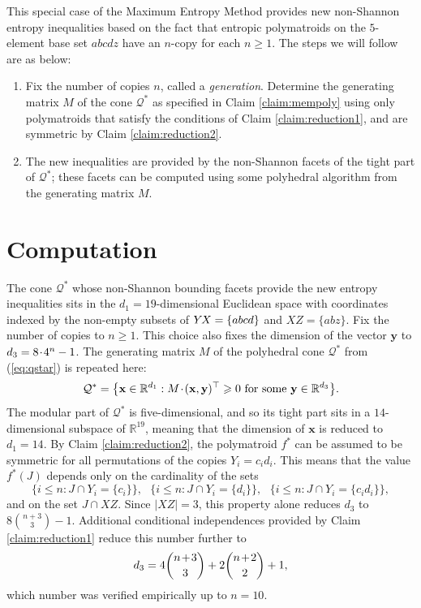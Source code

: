 \documentclass[reqno]{amsart}
\theoremstyle{definition}
\newcommand\tsp{\mkern 1.5mu}
\renewcommand\ge{\geqslant}\renewcommand\le{\leqslant}
\newcommand\R{\mathbb R}  %
\newcommand\T{\top}       %
\def\m#1{\tsp{#1}\tsp}
\def\YX{Y\mkern-2mu X}
\newcommand\blabel[1]{\hypertarget{#1}{}}
\begin{document}
This special case of the Maximum Entropy Method provides new non-Shannon
entropy inequalities based on the fact that entropic polymatroids on the
$5$-element base set $abcdz$ have an $n$-copy for each $n\ge 1$. The steps
we will follow are as below:
\begin{enumerate}
\item 
Fix the number of copies $n$, called a \emph{generation}. Determine the
generating matrix
$M$ of the cone $\mathcal Q^*$ as specified in Claim
\ref{claim:mempoly} using only polymatroids
that satisfy the conditions of Claim \ref{claim:reduction1}, and are
symmetric by Claim \ref{claim:reduction2}.
\item\blabel{(2)}
The new inequalities are provided by the non-Shannon facets of the
tight part of $\mathcal Q^*$; these facets can be computed using
some polyhedral algorithm from the generating matrix $M$.
\end{enumerate}


\section{Computation}\label{sec:compresults}

The cone $\mathcal Q^*$ whose non-Shannon bounding facets provide the new
entropy inequalities sits in the $d_1=19$-dimensional Euclidean space with
coordinates indexed by the non-empty subsets of $\YX=\{abcd\}$ and
$XZ=\{abz\}$. Fix the number of copies to $n\ge 1$. This choice also fixes
the dimension of the vector $\mathbf y$ to $d_3=8\m\cdot 4^n-1$. The
generating matrix $M$ of the polyhedral cone $\mathcal Q^*$ from
(\ref{eq:qstar}) is repeated here:
\begin{equation}\label{eq:Qrep}
   \mathcal Q^* = \big\{ \mathbf x\in\R^{d_1}:
     M\m\cdot(\mathbf x,\mathbf y)^\T\ge 0
     \mbox{ for some } \mathbf y\in\R^{d_3}
   \big\}.
\end{equation}
The modular part of $\mathcal Q^*$ is five-dimensional, and so its tight
part sits in a $14$-di\-men\-sional subspace of $\R^{19}$, meaning that the
dimension of $\mathbf x$ is reduced to $d_1=14$. By Claim
\ref{claim:reduction2}, the polymatroid $f^*$ can be assumed to be symmetric
for all permutations of the copies $Y_i=c_id_i$. This means that the value
$f^*(J)$ depends only on the cardinality of the sets
$$
   \big\{i\le n: J\cap Y_i=\{c_i\}\big\}, ~~~
   \big\{i\le n: J\cap Y_i=\{d_i\}\big\}, ~~~
   \big\{i\le n: J\cap Y_i=\{c_id_i\}\big\},
$$
and on the set $J\cap XZ$. Since $|XZ|=3$, this property alone reduces $d_3$
to $8{n+3\choose 3}-1$. Additional conditional independences provided by
Claim \ref{claim:reduction1} reduce this number further to
\begin{equation}\label{eq:d3}
   d_3 = 4{n\m+3\choose 3}+2{n\m+2\choose 2} + 1,
\end{equation}
which number was verified empirically up to $n=10$.
\end{document}
